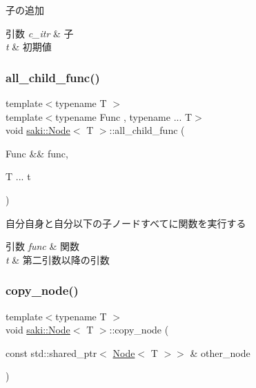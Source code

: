 子の追加 


\begin{DoxyParams}{引数}
{\em c\+\_\+itr} & 子 \\
\hline
{\em t} & 初期値 \\
\hline
\end{DoxyParams}
\mbox{\label{classsaki_1_1_node_aad51acc43e01039b19d22f4f09689f3b}} 
\subsubsection{\texorpdfstring{all\+\_\+child\+\_\+func()}{all\_child\_func()}}
{\footnotesize\ttfamily template$<$typename T $>$ \\
template$<$typename Func , typename ... T$>$ \\
void \mbox{\hyperlink{classsaki_1_1_node}{saki\+::\+Node}}$<$ T $>$\+::all\+\_\+child\+\_\+func (\begin{DoxyParamCaption}\item[{Func \&\&}]{func,  }\item[{T ...}]{t }\end{DoxyParamCaption})\hspace{0.3cm}{\ttfamily [inline]}}



自分自身と自分以下の子ノードすべてに関数を実行する 


\begin{DoxyParams}{引数}
{\em func} & 関数 \\
\hline
{\em t} & 第二引数以降の引数 \\
\hline
\end{DoxyParams}
\mbox{\label{classsaki_1_1_node_a0ea2c2df4ce2032a5c07e955df4b0046}} 
\subsubsection{\texorpdfstring{copy\+\_\+node()}{copy\_node()}}
{\footnotesize\ttfamily template$<$typename T $>$ \\
void \mbox{\hyperlink{classsaki_1_1_node}{saki\+::\+Node}}$<$ T $>$\+::copy\+\_\+node (\begin{DoxyParamCaption}\item[{const std\+::shared\+\_\+ptr$<$ \mbox{\hyperlink{classsaki_1_1_node}{Node}}$<$ T $>$$>$ \&}]{other\+\_\+node }\end{DoxyParamCaption})\hspace{0.3cm}{\ttfamily [inline]}}



